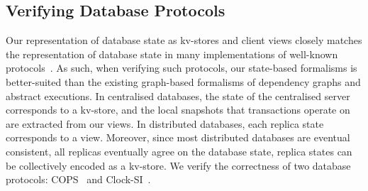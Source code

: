 \subsection{Verifying Database Protocols}
\label{sec:verify-impl}
%
Our representation of database state as kv-stores and client views closely matches the representation of database state in many implementations of 
well-known protocols~\cite{ramp,rola,cops,wren,redblue,PSI,NMSI,gdur,clocksi,distrsi}.
As such, when verifying such protocols, our state-based formalisms is better-suited than the existing graph-based formalisms of dependency graphs and abstract executions. 
In centralised databases, the state of the centralised server corresponds to a kv-store,
and the local snapshots that transactions operate on are extracted from our views.  
In distributed databases, each replica state corresponds to a view. 
Moreover, since most distributed databases are eventual consistent, 
\ie all replicas eventually agree on the database state,
replica states can be collectively encoded as a kv-store.
We verify the correctness of two database protocols:
COPS~\cite{cops} and Clock-SI~\cite{clocksi}.


